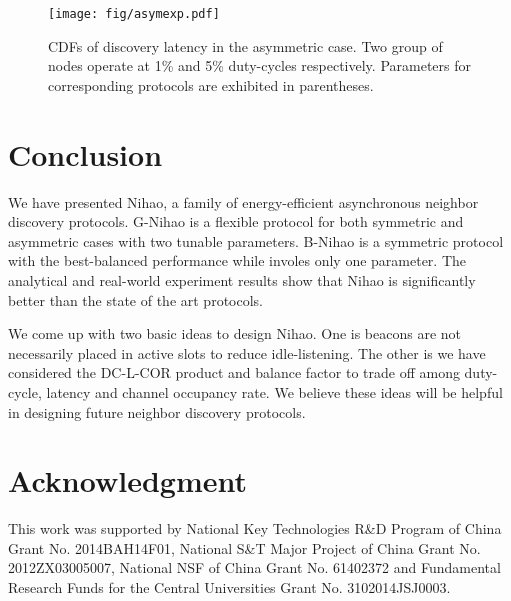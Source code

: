 \documentclass[conference]{IEEEtran}
\begin{document}
\begin{figure}[t]
    \centering
    \texttt{[image: fig/asymexp.pdf]}
    \caption{CDFs of discovery latency in the asymmetric case. Two group of nodes operate at 1\% and 5\% duty-cycles respectively. Parameters for corresponding protocols are exhibited in parentheses.}\label{asymexp}
\end{figure}

\section{Conclusion}\label{conclusion}
We have presented Nihao, a family of energy-efficient asynchronous neighbor discovery protocols.
G-Nihao is a flexible protocol for both symmetric and asymmetric cases with two tunable parameters.
B-Nihao is a symmetric protocol with the best-balanced performance while involes only one parameter.
The analytical and real-world experiment results show that Nihao is significantly better than the state of the art protocols.

We come up with two basic ideas to design Nihao.
One is beacons are not necessarily placed in active slots to reduce idle-listening.
The other is we have considered the DC-L-COR product and balance factor to trade off among duty-cycle, latency and channel occupancy rate.
We believe these ideas will be helpful in designing future neighbor discovery protocols.


\section*{Acknowledgment}
This work was supported by National Key Technologies R\&D Program of China Grant No. 2014BAH14F01,
National S\&T Major Project of China Grant No. 2012ZX03005007, National NSF of China Grant No. 61402372 and Fundamental Research Funds for the Central Universities Grant No. 3102014JSJ0003.




\end{document}

